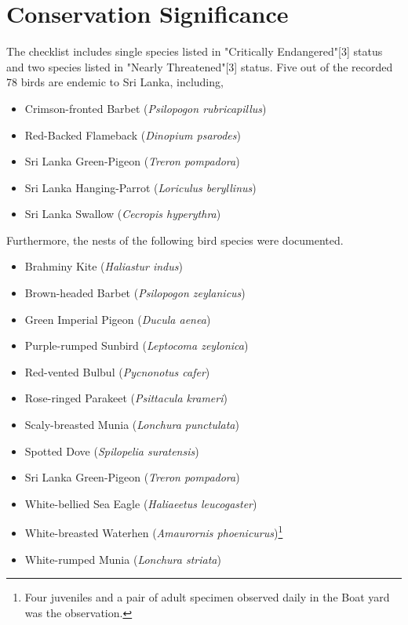 \section{Conservation Significance}
The checklist includes single species listed in "Critically Endangered"[3] status and two species listed in "Nearly Threatened"[3] status. Five out of the recorded 78 birds are endemic to Sri Lanka, including,
\begin{itemize}
\item Crimson-fronted Barbet (\textit{Psilopogon rubricapillus})
\item Red{-}Backed Flameback (\textit{Dinopium psarodes})
\item Sri Lanka Green-Pigeon (\textit{Treron pompadora})
 \item Sri Lanka Hanging-Parrot (\textit{Loriculus beryllinus})
   \item Sri Lanka Swallow (\textit{Cecropis hyperythra})
\end{itemize}
Furthermore, the nests of the following bird species were documented.
\begin{itemize}
\item Brahminy Kite (\textit{Haliastur indus})
\item Brown-headed Barbet (\textit{Psilopogon zeylanicus})
\item Green Imperial Pigeon (\textit{Ducula aenea})
\item Purple-rumped Sunbird (\textit{Leptocoma zeylonica})
\item Red-vented Bulbul (\textit{Pycnonotus cafer})
\item Rose-ringed Parakeet (\textit{Psittacula krameri})
\item Scaly-breasted Munia (\textit{Lonchura punctulata})
\item Spotted Dove (\textit{Spilopelia suratensis})
\item Sri Lanka Green-Pigeon (\textit{Treron pompadora})
\item White-bellied Sea Eagle (\textit{Haliaeetus leucogaster})
\item White-breasted Waterhen (\textit{Amaurornis phoenicurus})\footnote{Four juveniles and a pair of adult specimen observed daily in the Boat yard was the observation.}
\item White-rumped Munia (\textit{Lonchura striata})

\end{itemize}
